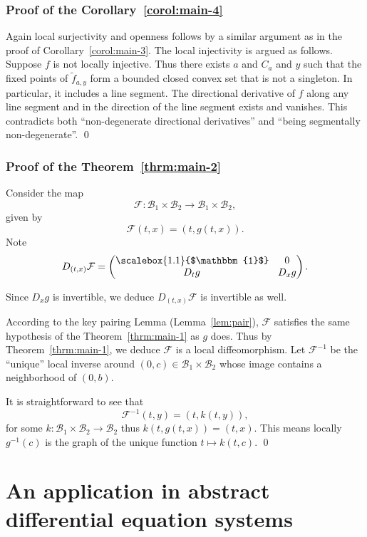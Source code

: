 \documentclass[a4, 12pt,leqno]{amsart}
\theoremstyle{plain}
\theoremstyle{definition}
\theoremstyle{remark}
\numberwithin{equation}{section}
\newcommand{\B}{\mathcal{B}}
\newcommand{\ident}{\raisebox{0pt}{\scalebox{1.1}{$\mathbbm{1}$}}\hspace{-1pt}}
\begin{document}
\subsubsection{\small\textbf{\textsf{Proof of the Corollary~\ref{corol:main-4}}}}
\par Again local surjectivity and openness follows by a similar argument as in the proof of Corollary~\ref{corol:main-3}. The local injectivity is argued as follows. Suppose $f$ is not locally injective. Thus there exists $a$ and $C_a$ and $y$ such that the fixed points of $\tilde{f}_{a,y}$ form a bounded closed convex set that is not a singleton. In particular, it includes a line segment. The directional derivative of $f$ along any line segment and in the direction of the line segment exists and vanishes. This contradicts both ``non-degenerate directional derivatives'' and ``being segmentally non-degenerate''.
\qed

\subsubsection{\small\textbf{\textsf{Proof of the Theorem~\ref{thrm:main-2}}}}
\par Consider the map
	\[
	\mathcal{F}: \B_1 \times \B_2 \to \B_1\times \B_2,
	\]
	given by
	\[
	\mathcal{F}(t,x) = \left(t, g(t,x)\right).
	\]
	Note
	\[
	D_{(t,x)}\mathcal{F} = \begin{pmatrix} \ident &  0 \\ D_tg & D_xg\end{pmatrix}.
	\]
	
\par Since $D_xg$ is invertible, we deduce $D_{(t,x)}\mathcal{F}$ is invertible as well. 
	
\par According to the key pairing Lemma (Lemma~\ref{lem:pair}), $\mathcal{F}$ satisfies the same hypothesis of the Theorem~\ref{thrm:main-1} as $g$ does. Thus by Theorem~\ref{thrm:main-1}, we deduce $\mathcal{F}$ is a local diffeomorphism. Let $\mathcal{F}^{-1}$ be the ``unique'' local inverse around $(0,c) \in \B_1\times \B_2$ whose image contains a neighborhood of $(0,b)$. 
	
\par It is straightforward to see that 
	\[
	\mathcal{F}^{-1}(t,y) = \left(t, k(t,y)\right),
	\]
	for some $k:\B_1\times\B_2 \to \B_2$ thus $k(t,g(t,x)) = (t,x)$. This means locally $g^{-1}(c)$ is the graph of the unique function $t \mapsto k(t,c)$. 
\qed
\section{An application in abstract differential equation systems}\label{sec:application}
\end{document}

